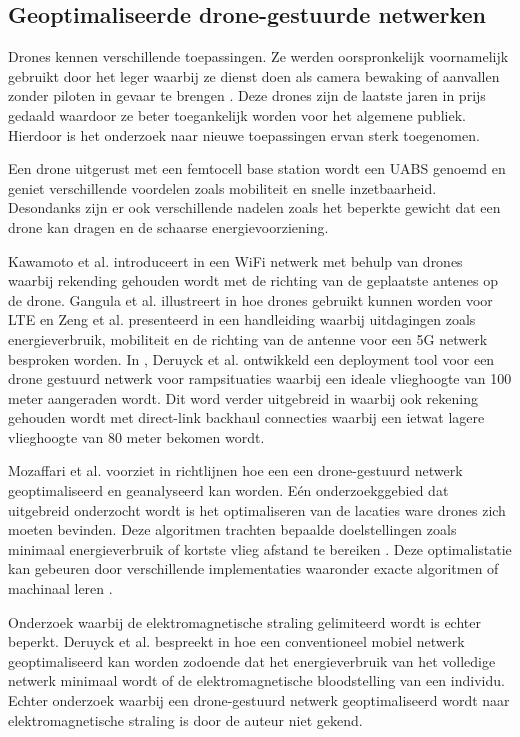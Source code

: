 \documentclass[twocolumn]{phdsymp} %
\begin{document}
\subsection{Geoptimaliseerde drone-gestuurde netwerken}

Drones kennen verschillende toepassingen. Ze werden oorspronkelijk voornamelijk gebruikt door het leger waarbij ze dienst doen  
als camera bewaking of aanvallen zonder piloten in gevaar te brengen \cite{U12}. 
Deze drones zijn de laatste jaren in prijs gedaald waardoor ze beter toegankelijk worden
voor het algemene publiek. Hierdoor is het onderzoek naar nieuwe toepassingen ervan sterk toegenomen.

Een drone uitgerust met een femtocell base station wordt een \gls{UABS} genoemd en 
geniet verschillende voordelen zoals mobiliteit en snelle inzetbaarheid.
Desondanks zijn er ook verschillende nadelen zoals het beperkte gewicht dat een drone kan dragen 
en de schaarse energievoorziening.

Kawamoto et al. introduceert in \cite{U11} een WiFi netwerk  met behulp van drones waarbij rekending gehouden wordt
met de richting van de geplaatste antenes op de drone. 
Gangula et al. illustreert in \cite{U10} hoe drones gebruikt kunnen worden voor \gls{LTE}
en
Zeng et al. presenteerd in  \cite{U12} een handleiding waarbij uitdagingen   zoals energieverbruik, mobiliteit en 
de richting van de antenne voor een 5G netwerk besproken worden. 
In \cite{J2}, Deruyck et al. ontwikkeld een deployment tool voor een drone gestuurd netwerk voor rampsituaties waarbij 
een ideale vlieghoogte van 100 meter aangeraden wordt.  
Dit word verder uitgebreid in \cite{U1} waarbij ook rekening gehouden wordt met 
 direct-link backhaul connecties waarbij een ietwat lagere vlieghoogte van 80 meter bekomen wordt.

Mozaffari et al. voorziet in \cite{U3} richtlijnen hoe een een drone-gestuurd netwerk geoptimaliseerd en geanalyseerd kan worden.
Eén onderzoekggebied dat uitgebreid onderzocht wordt is het optimaliseren van de lacaties ware drones zich moeten bevinden.
Deze algoritmen trachten bepaalde doelstellingen zoals minimaal energieverbruik of kortste vlieg afstand te bereiken \cite{U6,U7,U8,U9}.
Deze optimalistatie kan gebeuren door verschillende implementaties waaronder exacte algoritmen of machinaal leren \cite{U3,U5}.

Onderzoek waarbij de elektromagnetische straling gelimiteerd wordt is echter beperkt.
Deruyck et al. bespreekt in \cite{J1} hoe een conventioneel mobiel netwerk geoptimaliseerd kan worden zodoende dat het energieverbruik 
van het volledige netwerk minimaal wordt of de elektromagnetische bloodstelling van een individu.
Echter onderzoek waarbij een drone-gestuurd netwerk geoptimaliseerd wordt naar elektromagnetische straling is 
door de auteur niet gekend.
\end{document}
